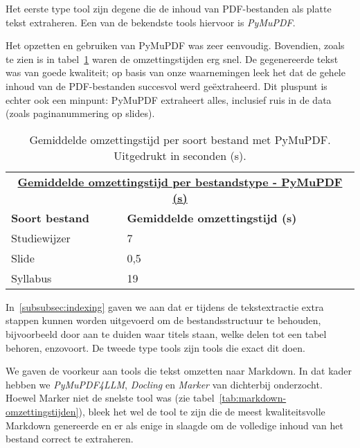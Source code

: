 Het eerste type tool zijn degene die de inhoud van PDF-bestanden als platte tekst extraheren. Een van de bekendste tools hiervoor is \emph{PyMuPDF}. 

Het opzetten en gebruiken van PyMuPDF was zeer eenvoudig. Bovendien, zoals te zien is in tabel~\ref{tab:pymupdf-omzettingstijden} waren de omzettingstijden erg snel. De gegenereerde tekst was van goede kwaliteit; op basis van onze waarnemingen leek het dat de gehele inhoud van de PDF-bestanden succesvol werd geëxtraheerd. Dit pluspunt is echter ook een minpunt: PyMuPDF extraheert alles, inclusief ruis in de data (zoals paginanummering op slides).

\begin{table}
    \centering
    \begin{tabular}{p{7cm} p{5cm}}
        \multicolumn{2}{c}{\uline{\textbf{Gemiddelde omzettingstijd per bestandstype - PyMuPDF (s)}}} \\
        \addlinespace[0.5ex]
        \textbf{Soort bestand} & \textbf{Gemiddelde omzettingstijd (s)} \\
        \midrule
        Studiewijzer & 7 \\
        Slide        & 0,5 \\
        Syllabus     & 19 \\
        \bottomrule
    \end{tabular}
    \caption{Gemiddelde omzettingstijd per soort bestand met PyMuPDF. Uitgedrukt in seconden (s).}
    \label{tab:pymupdf-omzettingstijden}
\end{table}

In~\ref{subsubsec:indexing} gaven we aan dat er tijdens de tekstextractie extra stappen kunnen worden uitgevoerd om de bestandsstructuur te behouden, bijvoorbeeld door aan te duiden waar titels staan, welke delen tot een tabel behoren, enzovoort. De tweede type tools zijn tools die exact dit doen.

We gaven de voorkeur aan tools die tekst omzetten naar Markdown. In dat kader hebben we \emph{PyMuPDF4LLM}, \emph{Docling} en \emph{Marker} van dichterbij onderzocht. Hoewel Marker niet de snelste tool was (zie tabel~\ref{tab:markdown-omzettingstijden}), bleek het wel de tool te zijn die de meest kwaliteitsvolle Markdown genereerde en er als enige in slaagde om de volledige inhoud van het bestand correct te extraheren.

